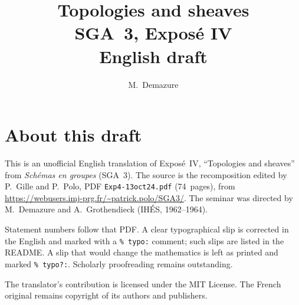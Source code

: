 \documentclass[11pt,a4paper,oneside]{amsbook}
\title[SGA~3, Expos\'e IV (English draft)]{Topologies and sheaves\\
{\normalsize SGA~3, Expos\'e IV\\English draft}}
\author{M.\ Demazure}
\date{}
\begin{document}
\frontmatter
\maketitle

\chapter*{About this draft}
This is an unofficial English translation of Expos\'e~IV, ``Topologies and sheaves''
from \textit{Sch\'emas en groupes} (SGA~3).
The source is the recomposition edited by P.~Gille and P.~Polo,
PDF \texttt{Exp4-13oct24.pdf} (74~pages),
from \url{https://webusers.imj-prg.fr/~patrick.polo/SGA3/}.
The seminar was directed by M.~Demazure and A.~Grothendieck
(IH\'ES, 1962--1964).

Statement numbers follow that PDF. A clear typographical slip is
corrected in the English and marked with a \texttt{\% typo:} comment;
such slips are listed in the README. A slip that would change the
mathematics is left as printed and marked \texttt{\% typo?:}.
Scholarly proofreading remains outstanding.

The translator's contribution is licensed under the MIT License.
The French original remains copyright of its authors and publishers.

\tableofcontents
\mainmatter












\end{document}

